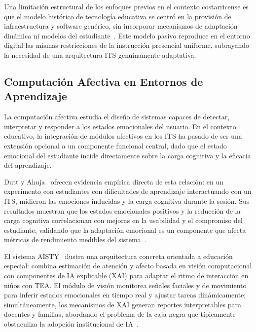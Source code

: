 Una limitación estructural de los enfoques previos en el contexto costarricense
es que el modelo histórico de tecnología educativa se centró en la provisión de
infraestructura y software genérico, sin incorporar mecanismos de adaptación
dinámica ni modelos del estudiante~\cite{PEN2025}. Este modelo pasivo reproduce
en el entorno digital las mismas restricciones de la instrucción presencial
uniforme, subrayando la necesidad de una arquitectura ITS genuinamente adaptativa.

\subsection{Computación Afectiva en Entornos de Aprendizaje}

La computación afectiva estudia el diseño de sistemas capaces de detectar,
interpretar y responder a los estados emocionales del usuario. En el contexto
educativo, la integración de módulos afectivos en los ITS ha pasado de ser una
extensión opcional a un componente funcional central, dado que el estado
emocional del estudiante incide directamente sobre la carga cognitiva y la
eficacia del aprendizaje.

Dutt y Ahuja~\cite{Dutt2024} ofrecen evidencia empírica directa de esta relación:
en un experimento con estudiantes con dificultades de aprendizaje interactuando
con un ITS, midieron las emociones inducidas y la carga cognitiva durante la
sesión. Sus resultados muestran que los estados emocionales positivos y la
reducción de la carga cognitiva correlacionan con mejoras en la usabilidad y el
compromiso del estudiante, validando que la adaptación emocional es un componente
que afecta métricas de rendimiento medibles del sistema~\cite{Dutt2024}.

El sistema AISTY~\cite{AISTY2024} ilustra una arquitectura concreta orientada a
educación especial: combina estimación de atención y afecto basada en visión
computacional con componentes de IA explicable (XAI) para adaptar el ritmo de
interacción en niños con TEA. El módulo de visión monitorea señales faciales y
de movimiento para inferir estados emocionales en tiempo real y ajustar tareas
dinámicamente; simultáneamente, los mecanismos de XAI generan reportes
interpretables para docentes y familias, abordando el problema de la caja negra
que típicamente obstaculiza la adopción institucional de IA~\cite{AISTY2024}.

